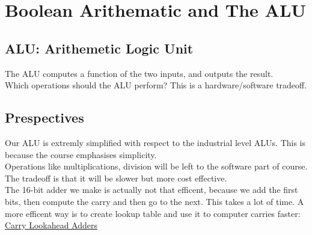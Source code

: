 \chapter{Boolean Arithematic and The ALU}

\section{ALU: Arithemetic Logic Unit}

The ALU computes a function of the two inputs, and outputs the
result.\\

Which operations should the ALU perform? This is a hardware/software
tradeoff.

\section{Prespectives}

Our ALU is extremly simplified with respect to the industrial
level ALUs. This is because the course emphasises simplicity.\\

Operations like multiplications, division will be left to the
software part of course. The tradeoff is that it will be slower
but more cost effective.\\

The 16-bit adder we make is actually not that efficent, because we
add the first bits, then compute the carry and then go to the next.
This takes a lot of time. A more efficent way is to create lookup
table and use it to computer carries faster: \href{https://en.wikipedia.org/wiki/Carry-lookahead_adder}{Carry Lookahead Adders} 
